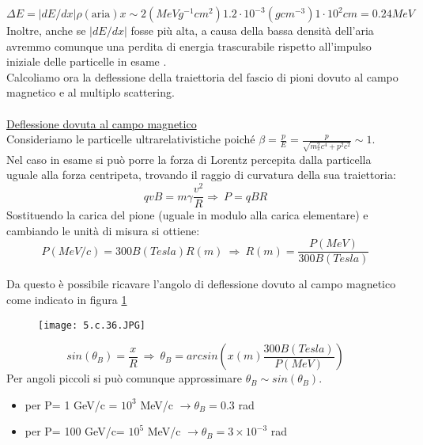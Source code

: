 \documentclass[twoside]{article}
\begin{document}
\begin{equation}
    \Delta E= |dE/dx|\rho(\text{aria})x\sim 2 (MeVg^{-1} cm^2) 1.2 \cdot 10^{-3}(g cm^{-3}) 1\cdot 10^2 cm= 0.24 MeV
\end{equation}
Inoltre, anche se $|dE/dx|$ fosse più alta, a causa della bassa densità dell'aria avremmo comunque una perdita di energia trascurabile rispetto all'impulso iniziale delle particelle in esame .
\\
Calcoliamo ora la deflessione della traiettoria del fascio di pioni dovuto al campo magnetico e al multiplo scattering.\\
\\
\underline{Deflessione dovuta al campo magnetico}\\
Consideriamo le particelle ultrarelativistiche poiché $\beta=\frac{p}{E}=\frac{p}{\sqrt{m_{\pi}^2c^4+p^2c^2}}\sim 1$.\\
Nel caso in esame si può porre la forza di Lorentz percepita dalla particella uguale alla forza centripeta, trovando il raggio di curvatura della sua traiettoria:
\begin{equation}
    qv B=m\gamma \frac{v^2}{R}  \Rightarrow \ P=qBR
\end{equation}
Sostituendo la carica del pione (uguale in modulo alla carica elementare) e cambiando le unità di misura si ottiene:
\begin{equation}
    P (MeV/c)=300 B(Tesla)R(m) \ \Rightarrow \ R(m)=\frac{P(MeV)}{300 B(Tesla)}
\end{equation}

Da questo è possibile ricavare l'angolo di deflessione dovuto al campo magnetico come indicato in figura \ref{mag}

\begin{figure}[H]
    \centering
    \texttt{[image: 5.c.36.JPG]}
    \label{mag}
\end{figure}
\begin{equation}
    sin(\theta_B)=\frac{x}{R} \ \Rightarrow \ \theta_B=arcsin\left(x (m)\frac{300 B (Tesla) }{P (MeV)}\right)
\end{equation}
Per angoli piccoli si può comunque approssimare $\theta_B \sim sin(\theta_B)$.
\begin{itemize}
    \item per P= 1 GeV/c = $10^{3}$ MeV/c $\rightarrow \theta_B= 0.3$ rad
    \item per P= 100 GeV/c= $10^{5}$ MeV/c $\rightarrow \theta_B= 3 \times 10^{-3}$ rad 
\end{itemize}
\end{document}
